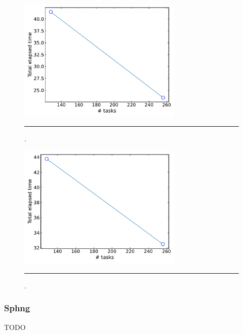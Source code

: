 \documentclass[10pt]{article}
\begin{document}
\begin{figure}[h!]
	\centering
	\includegraphics[width=0.7\textwidth]{Ramses_strong.pdf}
	\vspace{0.1cm}
	\hrule
	\vspace{0.1cm}
	\caption{.}
	\label{fig::ramses_ss}
\end{figure}


\begin{figure}[h!]
	\centering
	\includegraphics[width=0.7\textwidth]{Ramses_weak.pdf}
	\vspace{0.1cm}
	\hrule
	\vspace{0.1cm}
	\caption{.}
	\label{fig::ramses_ws}
\end{figure}


\clearpage
\subsubsection{Sphng}
TODO
\end{document}
